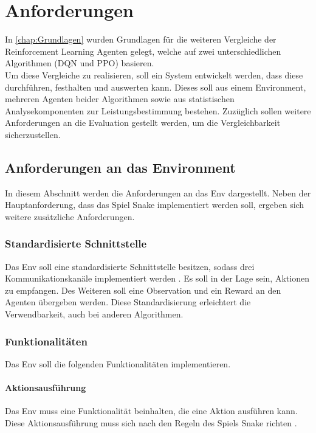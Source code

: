 \chapter{Anforderungen} \label{chap:Anforderungen}
In \autoref{chap:Grundlagen} wurden Grundlagen für die weiteren Vergleiche der Reinforcement Learning Agenten gelegt, welche auf zwei unterschiedlichen Algorithmen (DQN und PPO) basieren.\\
Um diese Vergleiche zu realisieren, soll ein System entwickelt werden, dass diese durchführen, festhalten und auswerten kann. Dieses soll aus einem Environment, mehreren Agenten beider Algorithmen sowie aus statistischen Analysekomponenten zur Leistungsbestimmung bestehen. Zuzüglich sollen weitere Anforderungen an die Evaluation gestellt werden, um die Vergleichbarkeit sicherzustellen.

\section{Anforderungen an das Environment} \label{sec:Anforderungen_Env}
In diesem Abschnitt werden die Anforderungen an das Env dargestellt. Neben der Hauptanforderung, dass das Spiel Snake implementiert werden soll, ergeben sich weitere zusätzliche Anforderungen.

\subsection{Standardisierte Schnittstelle} \label{subsec:Anforderungen_Schnittstelle}
Das Env soll eine standardisierte Schnittstelle besitzen, sodass drei Kommunikationskanäle implementiert werden . Es soll in der Lage sein, Aktionen zu empfangen. Des Weiteren soll eine Observation und ein Reward an den Agenten übergeben werden. Diese Standardisierung erleichtert die Verwendbarkeit, auch bei anderen Algorithmen.

\subsection{Funktionalitäten} \label{subsec:Anforderungen_Funktionalität_Env}
Das Env soll die folgenden Funktionalitäten implementieren.

\subsubsection{Aktionsausführung} \label{subsubsec:Anforderungen_Aktionsausführung}
Das Env muss eine Funktionalität beinhalten, die eine Aktion ausführen kann. Diese Aktionsausführung muss sich nach den Regeln des Spiels Snake richten .

